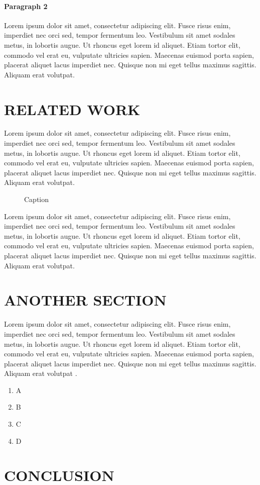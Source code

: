 \documentclass[english,paper=a4,twocolumn=true,DIV=calc,fontsize=9pt]{scrartcl}
\begin{document}
\paragraph{Paragraph 2}
Lorem ipsum dolor sit amet, consectetur adipiscing elit. Fusce risus enim, imperdiet nec orci sed, tempor fermentum leo. Vestibulum sit amet sodales metus, in lobortis augue. Ut rhoncus eget lorem id aliquet. Etiam tortor elit, commodo vel erat eu, vulputate ultricies sapien. Maecenas euismod porta sapien, placerat aliquet lacus imperdiet nec. Quisque non mi eget tellus maximus sagittis. Aliquam erat volutpat.

\section{RELATED WORK}
Lorem ipsum dolor sit amet, consectetur adipiscing elit. Fusce risus enim, imperdiet nec orci sed, tempor fermentum leo. Vestibulum sit amet sodales metus, in lobortis augue. Ut rhoncus eget lorem id aliquet. Etiam tortor elit, commodo vel erat eu, vulputate ultricies sapien. Maecenas euismod porta sapien, placerat aliquet lacus imperdiet nec. Quisque non mi eget tellus maximus sagittis. Aliquam erat volutpat.

\begin{figure}
\centering
\label{fig:fig1}
\caption{Caption}
\end{figure}

Lorem ipsum dolor sit amet, consectetur adipiscing elit. Fusce risus enim, imperdiet nec orci sed, tempor fermentum leo. Vestibulum sit amet sodales metus, in lobortis augue. Ut rhoncus eget lorem id aliquet. Etiam tortor elit, commodo vel erat eu, vulputate ultricies sapien. Maecenas euismod porta sapien, placerat aliquet lacus imperdiet nec. Quisque non mi eget tellus maximus sagittis. Aliquam erat volutpat.


\section{ANOTHER SECTION}
Lorem ipsum dolor sit amet, consectetur adipiscing elit. Fusce risus enim, imperdiet nec orci sed, tempor fermentum leo. Vestibulum sit amet sodales metus, in lobortis augue. Ut rhoncus eget lorem id aliquet. Etiam tortor elit, commodo vel erat eu, vulputate ultricies sapien. Maecenas euismod porta sapien, placerat aliquet lacus imperdiet nec. Quisque non mi eget tellus maximus sagittis. Aliquam erat volutpat \cite{test}.

\begin{enumerate}
    \item A
    \item B
    \item C
    \item D
\end{enumerate}


\section{CONCLUSION}

{}

\end{document}

